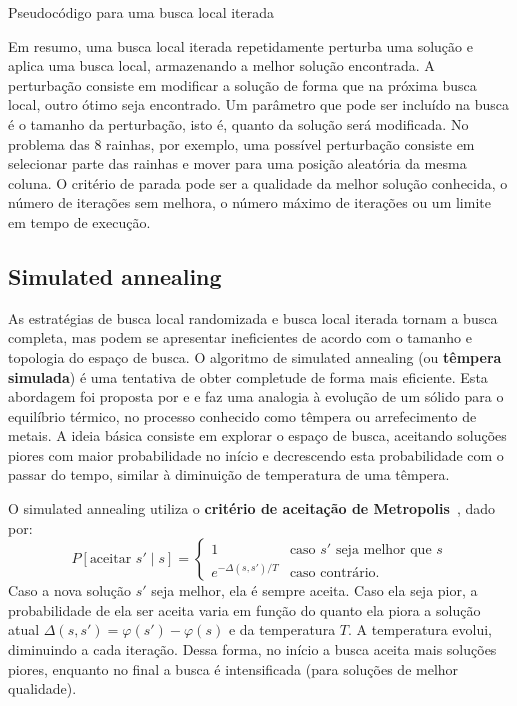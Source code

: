 \begin{algorithm}[h]
	\DontPrintSemicolon
	
	
	\caption{Pseudocódigo para uma busca local iterada}
	\label{alg:busca-local-iterada}
\end{algorithm}

Em resumo, uma busca local iterada repetidamente perturba uma solução e aplica uma busca local, armazenando a melhor solução encontrada. A perturbação consiste em modificar a solução de forma que na próxima busca local, outro ótimo seja encontrado. Um parâmetro que pode ser incluído na busca é o tamanho da perturbação, isto é, quanto da solução será modificada. No problema das 8 rainhas, por exemplo, uma possível perturbação consiste em selecionar parte das rainhas e mover para uma posição aleatória da mesma coluna. O critério de parada pode ser a qualidade da melhor solução conhecida, o número de iterações sem melhora, o número máximo de iterações ou um limite em tempo de execução.

\subsection{Simulated annealing}

As estratégias de busca local randomizada e busca local iterada tornam a busca completa, mas podem se apresentar ineficientes de acordo com o tamanho e topologia do espaço de busca. O algoritmo de simulated annealing (ou \textbf{têmpera simulada}) é uma tentativa de obter completude de forma mais eficiente. Esta abordagem foi proposta por \citet{KirkpatrickEtAl1983} e \citet{Cerny1985} e faz uma analogia à evolução de um sólido para o equilíbrio térmico, no processo conhecido como têmpera ou arrefecimento de metais. A ideia básica consiste em explorar o espaço de busca, aceitando soluções piores com maior probabilidade no início e decrescendo esta probabilidade com o passar do tempo, similar à diminuição de temperatura de uma têmpera.

O simulated annealing utiliza o \textbf{critério de aceitação de Metropolis}~\citep{MetropolisEtAl1953}, dado por:
$$
P[\text{aceitar } s' \mid s] = 
\begin{cases}
	1  & \text{caso } s' \text{ seja melhor que } s \\
	e^{-\Delta(s, s')/T}  & \text{caso contrário.}
\end{cases}
$$
Caso a nova solução $s'$ seja melhor, ela é sempre aceita. Caso ela seja pior, a probabilidade de ela ser aceita varia em função do quanto ela piora a solução atual $\Delta(s, s') = \varphi(s') - \varphi(s)$ e da temperatura $T$. A temperatura evolui, diminuindo a cada iteração. Dessa forma, no início a busca aceita mais soluções piores, enquanto no final a busca é intensificada (para soluções de melhor qualidade).

